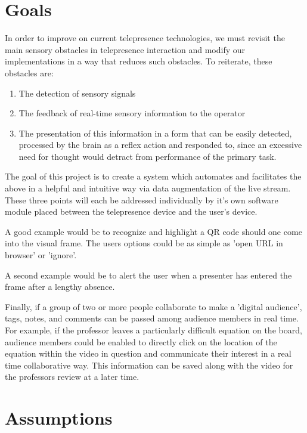 \documentclass[a4paper,12pt]{report}
\begin{document}
\section{Goals}

In order to improve on current telepresence technologies, we must revisit the main sensory obstacles in telepresence interaction and modify our implementations in a way that reduces such obstacles. To reiterate, these obstacles are:
	\begin{enumerate}
		\item The detection of sensory signals
		\item The feedback of real-time sensory information to the operator
		\item The presentation of this information in a form that can be easily detected, processed by the brain as a reflex action and responded to, since an excessive need for thought would detract from performance of the primary task.
	\end{enumerate}
	\begin{flushright}
		\cite{540147}
	\end{flushright}

The goal of this project is to create a system which automates and facilitates the above in a helpful and intuitive way via data augmentation of the live stream. These three points will each be addressed individually by it's own software module placed between the telepresence device and the user's device.

A good example would be to recognize and highlight a QR code should one come into the visual frame. The users options could be as simple as 'open URL in browser' or 'ignore'.

A second example would be to alert the user when a presenter has entered the frame after a lengthy absence.

Finally, if a group of two or more people collaborate to make a 'digital audience', tags, notes, and comments can be passed among audience members in real time. For example, if the professor leaves a particularly difficult equation on the board, audience members could be enabled to directly click on the location of the equation within the video in question and communicate their interest in a real time collaborative way. This information can be saved along with the video for the professors review at a later time.

\section{Assumptions}
\end{document}

